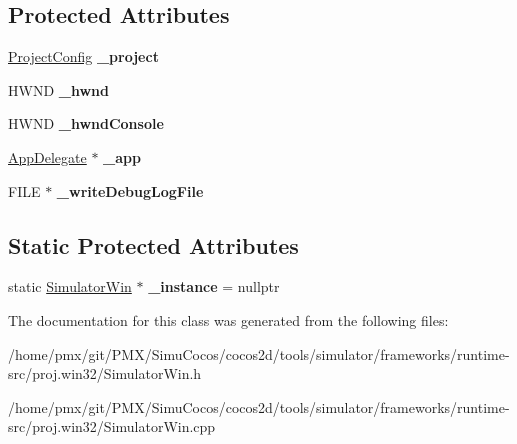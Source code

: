 \subsection*{Protected Attributes}
\begin{DoxyCompactItemize}
\item 
\mbox{\label{classSimulatorWin_ac0e162161cfb1a3d0a7d78d1a4a0e6b0}} 
\hyperlink{classProjectConfig}{Project\+Config} {\bfseries \+\_\+project}
\item 
\mbox{\label{classSimulatorWin_a3b6aa22a83e3aa7a8ca9a6c40e56ca33}} 
H\+W\+ND {\bfseries \+\_\+hwnd}
\item 
\mbox{\label{classSimulatorWin_ad4440e8495c075597c2a22f409d37bb7}} 
H\+W\+ND {\bfseries \+\_\+hwnd\+Console}
\item 
\mbox{\label{classSimulatorWin_a92407493f6c0fbb613440ce80da7994d}} 
\hyperlink{classAppDelegate}{App\+Delegate} $\ast$ {\bfseries \+\_\+app}
\item 
\mbox{\label{classSimulatorWin_a37c36dc2aee0387d5abe5b1d5445567d}} 
F\+I\+LE $\ast$ {\bfseries \+\_\+write\+Debug\+Log\+File}
\end{DoxyCompactItemize}
\subsection*{Static Protected Attributes}
\begin{DoxyCompactItemize}
\item 
\mbox{\label{classSimulatorWin_aaf9fcbae303a5c6f233b4bb23dd7f5a9}} 
static \hyperlink{classSimulatorWin}{Simulator\+Win} $\ast$ {\bfseries \+\_\+instance} = nullptr
\end{DoxyCompactItemize}


The documentation for this class was generated from the following files\+:\begin{DoxyCompactItemize}
\item 
/home/pmx/git/\+P\+M\+X/\+Simu\+Cocos/cocos2d/tools/simulator/frameworks/runtime-\/src/proj.\+win32/Simulator\+Win.\+h\item 
/home/pmx/git/\+P\+M\+X/\+Simu\+Cocos/cocos2d/tools/simulator/frameworks/runtime-\/src/proj.\+win32/Simulator\+Win.\+cpp\end{DoxyCompactItemize}
